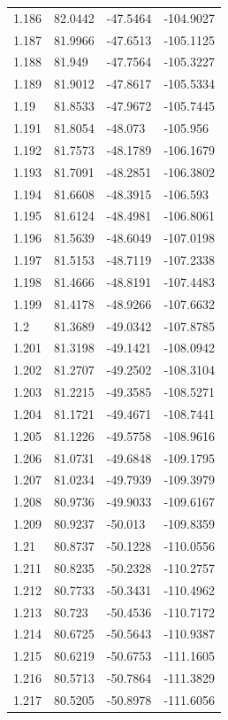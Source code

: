 \begin{tabular}{llll}
1.186 & 82.0442 & -47.5464 & -104.9027 \\
1.187 & 81.9966 & -47.6513 & -105.1125 \\
1.188 & 81.949 & -47.7564 & -105.3227 \\
1.189 & 81.9012 & -47.8617 & -105.5334 \\
1.19 & 81.8533 & -47.9672 & -105.7445 \\
1.191 & 81.8054 & -48.073 & -105.956 \\
1.192 & 81.7573 & -48.1789 & -106.1679 \\
1.193 & 81.7091 & -48.2851 & -106.3802 \\
1.194 & 81.6608 & -48.3915 & -106.593 \\
1.195 & 81.6124 & -48.4981 & -106.8061 \\
1.196 & 81.5639 & -48.6049 & -107.0198 \\
1.197 & 81.5153 & -48.7119 & -107.2338 \\
1.198 & 81.4666 & -48.8191 & -107.4483 \\
1.199 & 81.4178 & -48.9266 & -107.6632 \\
1.2 & 81.3689 & -49.0342 & -107.8785 \\
1.201 & 81.3198 & -49.1421 & -108.0942 \\
1.202 & 81.2707 & -49.2502 & -108.3104 \\
1.203 & 81.2215 & -49.3585 & -108.5271 \\
1.204 & 81.1721 & -49.4671 & -108.7441 \\
1.205 & 81.1226 & -49.5758 & -108.9616 \\
1.206 & 81.0731 & -49.6848 & -109.1795 \\
1.207 & 81.0234 & -49.7939 & -109.3979 \\
1.208 & 80.9736 & -49.9033 & -109.6167 \\
1.209 & 80.9237 & -50.013 & -109.8359 \\
1.21 & 80.8737 & -50.1228 & -110.0556 \\
1.211 & 80.8235 & -50.2328 & -110.2757 \\
1.212 & 80.7733 & -50.3431 & -110.4962 \\
1.213 & 80.723 & -50.4536 & -110.7172 \\
1.214 & 80.6725 & -50.5643 & -110.9387 \\
1.215 & 80.6219 & -50.6753 & -111.1605 \\
1.216 & 80.5713 & -50.7864 & -111.3829 \\
1.217 & 80.5205 & -50.8978 & -111.6056 \\

\end{tabular}
